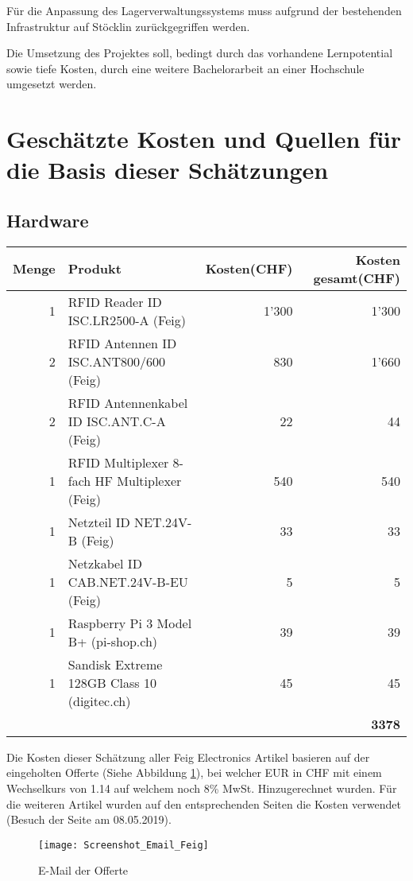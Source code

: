 Für die Anpassung des Lagerverwaltungssystems muss aufgrund der bestehenden Infrastruktur auf Stöcklin zurückgegriffen werden.

Die Umsetzung des Projektes soll, bedingt durch das vorhandene Lernpotential sowie tiefe Kosten, durch eine weitere Bachelorarbeit an einer Hochschule umgesetzt werden.

\section{Geschätzte Kosten und Quellen für die Basis dieser Schätzungen}
\subsection{Hardware}
\begin{tabularx}{\textwidth}{|r|X|r|r|}
	\hline
	\textbf{Menge} & \textbf{Produkt} & \textbf{Kosten(CHF)} & \textbf{Kosten gesamt(CHF)} \\
	\hline
	1 & RFID Reader ID ISC.LR2500-A (Feig) & 1'300 & 1'300 \\
	\hline
	2 & RFID Antennen ID ISC.ANT800/600 (Feig)& 830 & 1'660 \\
	\hline
	2 & RFID Antennenkabel ID ISC.ANT.C-A (Feig) & 22 & 44 \\
	\hline
	1 & RFID Multiplexer 8-fach HF Multiplexer (Feig) & 540 & 540 \\
	\hline
	1 & Netzteil ID NET.24V-B (Feig) & 33 & 33 \\
	\hline
	1 & Netzkabel ID CAB.NET.24V-B-EU (Feig) & 5 & 5 \\
	\hline
	1 & Raspberry Pi 3 Model B+ (pi-shop.ch)& 39 & 39 \\
	\hline
	1 & Sandisk Extreme 128GB Class 10 (digitec.ch)& 45 & 45 \\
	\hline
	& & & \textbf{3378} \\
	\hline
\end{tabularx}

Die Kosten dieser Schätzung aller Feig Electronics Artikel basieren auf der eingeholten Offerte (Siehe Abbildung \ref{fig:offerteFeig}), bei welcher EUR in CHF mit einem Wechselkurs von 1.14 auf welchem noch 8\% MwSt. Hinzugerechnet wurden.
Für die weiteren Artikel wurden auf den entsprechenden Seiten die Kosten verwendet (Besuch der Seite am 08.05.2019).

\begin{figure}[h!]
	\centering
	\texttt{[image: Screenshot\_Email\_Feig]}
	\caption{E-Mail der Offerte}
	\label{fig:offerteFeig}
\end{figure}

